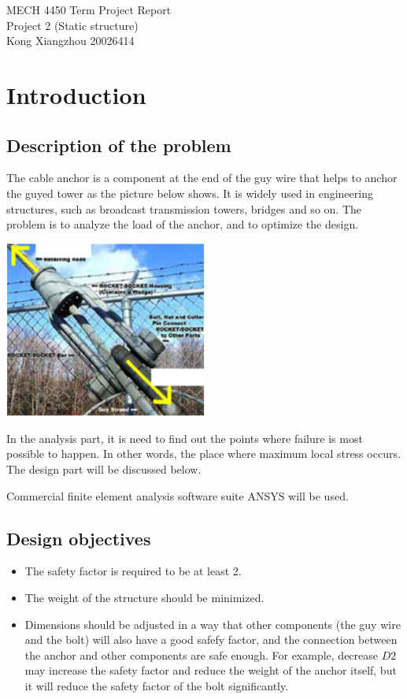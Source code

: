 \documentclass[a4paper,14pt]{extarticle}
\begin{document}
\begin{center}
\LARGE{MECH 4450 Term Project Report}\\\vspace{1em}
\Large{Project 2 (Static structure)}\\\vspace{1em}
\Large{Kong Xiangzhou 20026414}\\\vspace{1em}
\end{center}
\section{Introduction}
\subsection{Description of the problem}
The cable anchor is a component at the end of the guy wire that helps to anchor the guyed tower as the picture below shows. It is widely used in engineering structures, such as broadcast transmission towers, bridges and so on. The problem is to analyze the load of the anchor, and to optimize the design.

\begin{center}\includegraphics[width=0.5\textwidth]{DESCRIPTION.png}\end{center}

In the analysis part, it is need to find out the points where failure is most possible to happen. In other words, the place where maximum local stress occurs. The design part will be discussed below.

Commercial finite element analysis software suite ANSYS will be used.
\subsection{Design objectives}
\begin{itemize}
\item The safety factor is required to be at least 2. 
\item The weight of the structure should be minimized.
\item Dimensions should be adjusted in a way that other components (the guy wire and the bolt) will also have a good safefy factor, and the connection between the anchor and other components are safe enough. For example, decrease $D2$ may increase the safety factor and reduce the weight of the anchor itself, but it will reduce the safety factor of the bolt significantly.
\end{itemize}
\end{document}
